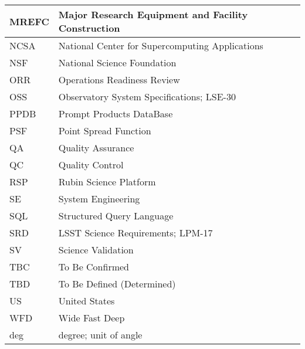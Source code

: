 \begin{longtable}{p{}p{}}
MREFC & Major Research Equipment and Facility Construction \\\hline
NCSA & National Center for Supercomputing Applications \\\hline
NSF & National Science Foundation \\\hline
ORR & Operations Readiness Review \\\hline
OSS & Observatory System Specifications; LSE-30 \\\hline
PPDB & Prompt Products DataBase \\\hline
PSF & Point Spread Function \\\hline
QA & Quality Assurance \\\hline
QC & Quality Control \\\hline
RSP & Rubin Science Platform \\\hline
SE & System Engineering \\\hline
SQL & Structured Query Language \\\hline
SRD & LSST Science Requirements; LPM-17 \\\hline
SV & Science Validation \\\hline
TBC & To Be Confirmed \\\hline
TBD & To Be Defined (Determined) \\\hline
US & United States \\\hline
WFD & Wide Fast Deep \\\hline
deg & degree; unit of angle \\\hline
\end{longtable}
